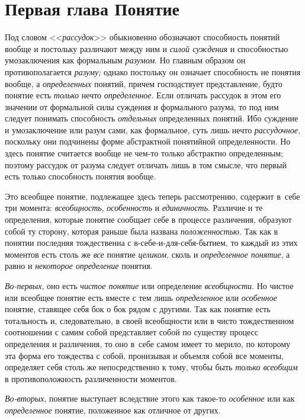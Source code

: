 \bigskip

\chapter[{\em Первая глава} Понятие]{Первая глава Понятие}
Под словом <<{\em рассудок}>> обыкновенно обозначают способность
понятий вообще и постольку различают между
ним и {\em силой суждения} и способностью умозаключения как формальным
{\em разумом}. Но главным образом он противополагается
{\em разуму;} однако постольку он означает способность не понятия вообще, а
{\em определенных} понятий, причем господствует представление, будто понятие
есть {\em только} нечто {\em определенное}. Если
отличать рассудок в этом его значении от формальной силы суждения и
формального разума, то под ним следует понимать способность {\em отдельных}
определенных понятий. Ибо суждение и умозаключение или разум
сами, как формальное, суть лишь нечто {\em рассудочное},
поскольку они подчинены форме абстрактной понятийной
определенности. Но здесь понятие считается вообще не чем-то только
абстрактно определенным; поэтому рассудок от разума следует отличать лишь в
том смысле, что первый есть только способность понятия вообще.

Это всеобщее понятие, подлежащее здесь теперь рассмотрению,
содержит в~себе три момента: {\em всеобщность}, {\em особенность} и
{\em единичность}. Различие и те определения, которые понятие сообщает себе
в процессе различения, образуют собой ту сторону, которая раньше была названа
{\em положенностью}. Так
как в понятии последняя тождественна с в-себе-и-для-себя-бытием, то каждый
из этих моментов есть столь же {\em все} понятие {\em целиком}, сколь и
{\em определенное понятие}, а равно и {\em некоторое определение} понятия.

{\em Во-первых}, оно есть {\em чистое понятие} или определение
{\em всеобщности}. Но чистое или всеобщее понятие есть вместе с тем лишь
{\em определенное} или {\em особенное} понятие,
ставящее себя бок о бок рядом с другими. Так как понятие есть тотальность
и, следовательно, в своей всеобщности или в чисто тождественном соотношении
с самим собой представляет собой по существу процесс определения и
различения, то оно в~себе самом имеет то мерило, по которому эта форма его
тождества с собой, пронизывая и объемля собой все моменты, определяет себя
столь же непосредственно к тому, чтобы быть
{\em только всеобщим} в противоположность различенности моментов.

{\em Во-вторых}, понятие выступает вследствие этого как такое-то
{\em особенное} или как {\em определенное} понятие, положенное как
отличное от других.

